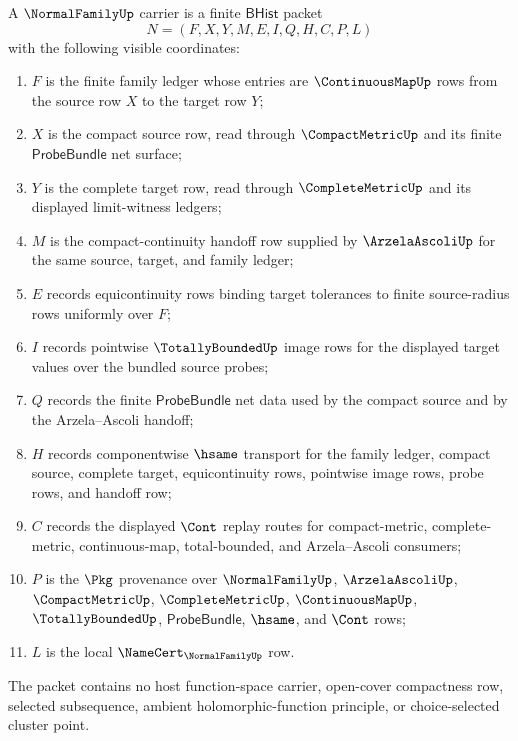 \begin{definition}
\label{def:normal-family-carrier}
A $\NormalFamilyUp$ carrier is a finite $\mathsf{BHist}$ packet
$$
N=(F,X,Y,M,E,I,Q,H,C,P,L)
$$
with the following visible coordinates:
\begin{enumerate}
\item $F$ is the finite family ledger whose entries are $\ContinuousMapUp$ rows from the source row $X$ to the target row $Y$;
\item $X$ is the compact source row, read through $\CompactMetricUp$ and its finite $\mathsf{ProbeBundle}$ net surface;
\item $Y$ is the complete target row, read through $\CompleteMetricUp$ and its displayed limit-witness ledgers;
\item $M$ is the compact-continuity handoff row supplied by $\ArzelaAscoliUp$ for the same source, target, and family ledger;
\item $E$ records equicontinuity rows binding target tolerances to finite source-radius rows uniformly over $F$;
\item $I$ records pointwise $\TotallyBoundedUp$ image rows for the displayed target values over the bundled source probes;
\item $Q$ records the finite $\mathsf{ProbeBundle}$ net data used by the compact source and by the Arzela--Ascoli handoff;
\item $H$ records componentwise $\hsame$ transport for the family ledger, compact source, complete target, equicontinuity rows, pointwise image rows, probe rows, and handoff row;
\item $C$ records the displayed $\Cont$ replay routes for compact-metric, complete-metric, continuous-map, total-bounded, and Arzela--Ascoli consumers;
\item $P$ is the $\Pkg$ provenance over $\NormalFamilyUp$, $\ArzelaAscoliUp$, $\CompactMetricUp$, $\CompleteMetricUp$, $\ContinuousMapUp$, $\TotallyBoundedUp$, $\mathsf{ProbeBundle}$, $\hsame$, and $\Cont$ rows;
\item $L$ is the local $\NameCert_{\NormalFamilyUp}$ row.
\end{enumerate}
The packet contains no host function-space carrier, open-cover compactness row, selected subsequence, ambient holomorphic-function principle, or choice-selected cluster point.
\end{definition}

